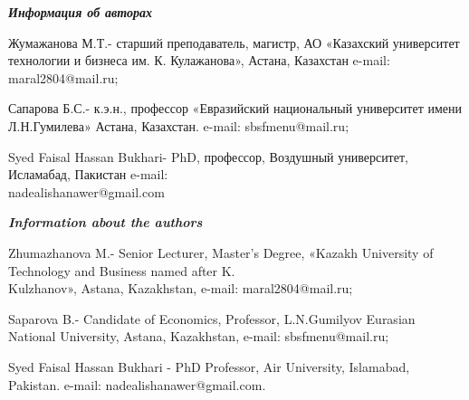 \begin{authorinfo}
\emph{{\bfseries Информация об авторах}}

Жумажанова М.Т.- старший преподаватель, магистр, АО «Казахский
университет технологии и бизнеса им. К. Кулажанова», Астана, Казахстан
e-mail: maral2804@mail.ru;

Сапарова Б.С.- к.э.н., профессор «Евразийский национальный университет
имени Л.Н.Гумилева» Астана, Казахстан. e-mail: sbsfmenu@mail.ru;

Syed Faisal Hassan Bukhari- PhD, профессор, Воздушный университет,
Исламабад, Пакистан e-mail: \\nadealishanawer@gmail.com

\emph{{\bfseries Information about the authors}}

Zhumazhanova M.- Senior Lecturer, Master's Degree, «Kazakh University of
Technology and Business named after K. \\Kulzhanov», Astana, Kazakhstan,
e-mail: maral2804@mail.ru;

Saparova B.- Candidate of Economics, Professor, L.N.Gumilyov Eurasian
National University, Astana, Kazakhstan, e-mail: sbsfmenu@mail.ru;

Syed Faisal Hassan Bukhari - PhD Professor, Air University, Islamabad,
Pakistan. e-mail: nadealishanawer@gmail.com.
\end{authorinfo}
